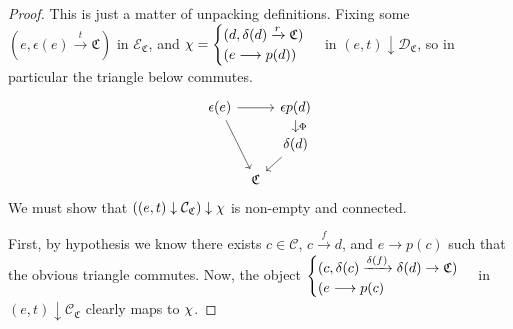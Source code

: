 \documentclass[a4paper,10pt
,draft
]{article}%
\renewcommand{\1}{\eta}%
\begin{document}
\begin{proof}
      This is just a matter of unpacking definitions.
      Fixing some $(e, \epsilon(e) \xrightarrow{t} \mathfrak C)$ in $\mathcal E_{\mathfrak C}$,
      and $\chi = \begin{cases}
            (d, \delta(d) \xrightarrow{r} \mathfrak C)
            \\
            (e \longrightarrow p(d))
      \end{cases}$
      in $(e,t) \downarrow \mathcal D_{\mathfrak C}$,
      so in particular the triangle below commutes.
      \begin{equation}
            \begin{tikzcd}[row sep = small,column sep = tiny]
                  \epsilon(e) \arrow[rr] \arrow[ddr]
                  &&
                  \epsilon p(d) \arrow[d, "\Phi"]
                  \\
                  &&
                  \delta(d) \arrow[dl]
                  \\
                  &
                  \mathfrak C
            \end{tikzcd}
      \end{equation}
      We must show that $\left((e,t) \downarrow \mathcal C_{\mathfrak C} \right) \downarrow \chi$ is non-empty and connected.

      First, by hypothesis we know there exists $c \in \mathcal C$, $c \xrightarrow{f} d$, and $e \to p(c)$ such that the obvious triangle commutes.
      Now, the object 
      $\begin{cases}
            (c, \delta(c) \xrightarrow{\delta(f)} \delta(d) \to \mathfrak C)
            \\
            (e \longrightarrow p(c)
      \end{cases}$
      in $(e,t) \downarrow \mathcal C_{\mathfrak C}$ clearly maps to $\chi$.


\end{proof}
\end{document}
